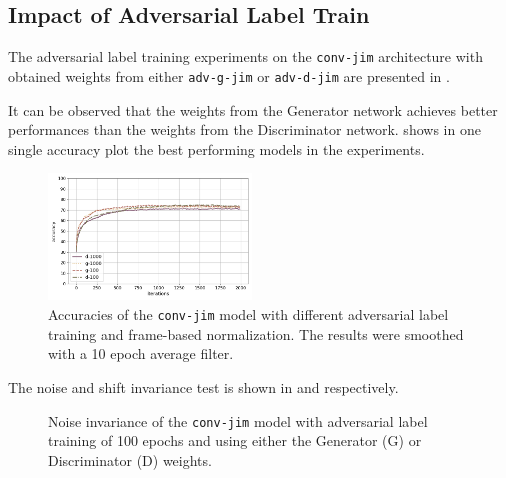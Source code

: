 \subsection{Impact of Adversarial Label Train}\label{sec:exp_adv_label}
The adversarial label training experiments on the \texttt{conv-jim} architecture with obtained weights from either \texttt{adv-g-jim} or \texttt{adv-d-jim} are presented in .

It can be observed that the weights from the Generator network achieves better performances than the weights from the Discriminator network.
 shows in one single accuracy plot the best performing models in the experiments.
\begin{figure}[!ht]
  \centering
  \includegraphics[width=0.48\textwidth]{./5_exp/figs/exp_adv_label_acc_conv-jim.png}
  \caption{Accuracies of the \texttt{conv-jim} model with different adversarial label training and frame-based normalization. The results were smoothed with a 10 epoch average filter.}
  \label{fig:exp_adv_label_acc_conv-jim}
\end{figure}
\FloatBarrier
\noindent
The noise and shift invariance test is shown in  and  respectively.
\begin{figure}[!ht]
  \centering
  \qquad
  \caption{Noise invariance of the \texttt{conv-jim} model with adversarial label training of 100 epochs and using either the Generator (G) or Discriminator (D) weights.}
  \label{fig:exp_adv_label_tb_noise_conv-jim}
\end{figure}
